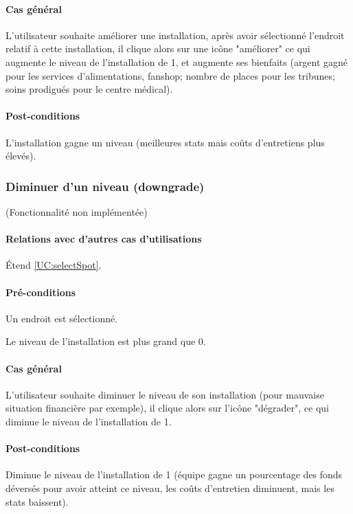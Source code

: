 \paragraph{Cas général}
L'utilisateur souhaite améliorer une installation, après avoir sélectionné l'endroit relatif à cette installation, il clique alors sur une icône "améliorer" ce qui augmente le niveau de l'installation de 1, et augmente ses bienfaits (argent gagné pour les services d'alimentations, fanshop; nombre de places pour les tribunes; soins prodigués pour le centre médical).
\paragraph{Post-conditions}
\begin{list}{}{\leftmargin=1.5em}
\item{L'installation gagne un niveau (meilleures stats mais coûts d'entretiens plus élevés).}
\end{list}

\subsubsection{Diminuer d'un niveau (downgrade)}
\label{UC:downgrade}
(Fonctionnalité non implémentée)
\paragraph{Relations avec d'autres cas d'utilisations}
Étend \ref{UC:selectSpot}.
\paragraph{Pré-conditions}
\begin{list}{}{\leftmargin=1.5em}
\item{Un endroit est sélectionné.}
\item{Le niveau de l'installation est plus grand que 0.}
\end{list}
\paragraph{Cas général}
L'utilisateur souhaite diminuer le niveau de son installation (pour mauvaise situation financière par exemple), il clique alors sur l'icône "dégrader", ce qui diminue le niveau de l'installation de 1. 
\paragraph{Post-conditions}
Diminue le niveau de l'installation de 1 (équipe gagne un pourcentage des fonds déversés pour avoir atteint ce niveau, les coûts d'entretien diminuent, mais les stats baissent).


